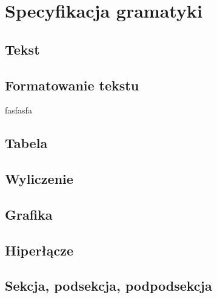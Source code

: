 \chapter{Specyfikacja gramatyki}

\section{Tekst}

\section{Formatowanie tekstu}
    fasfasfa

\section{Tabela}

\section{Wyliczenie}

\section{Grafika}

\section{Hiperłącze}

\section{Sekcja, podsekcja, podpodsekcja}


